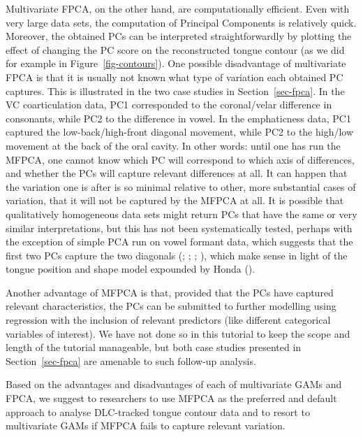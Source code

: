 \documentclass[
  man,
  longtable,
  nolmodern,
  notxfonts,
  notimes,
  colorlinks=true,linkcolor=blue,citecolor=blue,urlcolor=blue]{apa7}
\begin{document}
Multivariate FPCA, on the other hand, are computationally efficient.
Even with very large data sets, the computation of Principal Components
is relatively quick. Moreover, the obtained PCs can be interpreted
straightforwardly by plotting the effect of changing the PC score on the
reconstructed tongue contour (as we did for example in
Figure~\ref{fig-contours}). One possible disadvantage of multivariate
FPCA is that it is usually not known what type of variation each
obtained PC captures. This is illustrated in the two case studies in
Section~\ref{sec-fpca}. In the VC coarticulation data, PC1 corresponded
to the coronal/velar difference in consonants, while PC2 to the
difference in vowel. In the emphaticness data, PC1 captured the
low-back/high-front diagonal movement, while PC2 to the high/low
movement at the back of the oral cavity. In other words: until one has
run the MFPCA, one cannot know which PC will correspond to which axis of
differences, and whether the PCs will capture relevant differences at
all. It can happen that the variation one is after is so minimal
relative to other, more substantial cases of variation, that it will not
be captured by the MFPCA at all. It is possible that qualitatively
homogeneous data sets might return PCs that have the same or very
similar interpretations, but this has not been systematically tested,
perhaps with the exception of simple PCA run on vowel formant data,
which suggests that the first two PCs capture the two diagonals
(;
;
;
), which make
sense in light of the tongue position and shape model expounded by Honda
().

Another advantage of MFPCA is that, provided that the PCs have captured
relevant characteristics, the PCs can be submitted to further modelling
using regression with the inclusion of relevant predictors (like
different categorical variables of interest). We have not done so in
this tutorial to keep the scope and length of the tutorial manageable,
but both case studies presented in Section~\ref{sec-fpca} are amenable
to such follow-up analysis.

Based on the advantages and disadvantages of each of multivariate GAMs
and FPCA, we suggest to researchers to use MFPCA as the preferred and
default approach to analyse DLC-tracked tongue contour data and to
resort to multivariate GAMs if MFPCA fails to capture relevant
variation.
\end{document}
